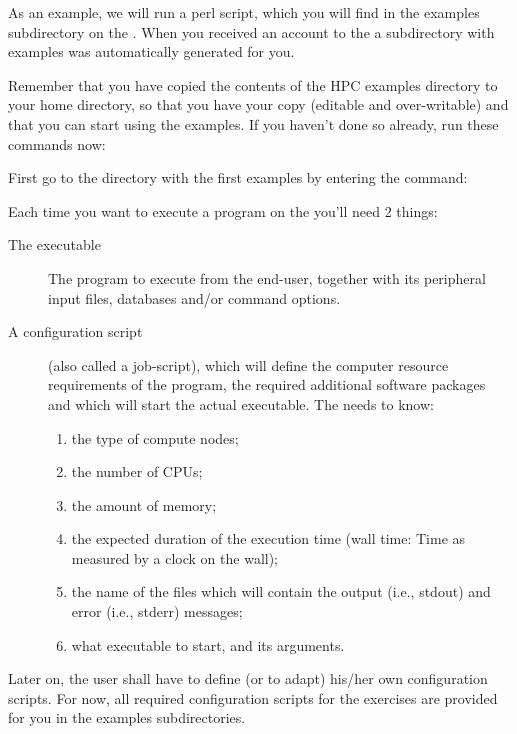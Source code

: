 As an example, we will run a perl script, which you will find in the examples
subdirectory on the \hpc. When you received an account to the \hpc a
subdirectory with examples was automatically generated for you.

Remember that you have copied the contents of the HPC examples directory to
your home directory, so that you have your  copy (editable
and over-writable) and that you can start using the examples. If you haven't
done so already, run these commands now:

\begin{prompt}
\end{prompt}

First go to the directory with the first examples by entering the command:

\begin{prompt}
\end{prompt}

Each time you want to execute a program on the \hpc you'll need 2 things:

\begin{description}
  \item[The executable] The program to execute from the end-user, together with its peripheral input files, databases and/or command options.
  \item[A configuration script] (also called a job-script), which will define the computer resource requirements of the program, the required additional software packages and which will start the actual executable.  The \hpc needs to know:
    \begin{enumerate}
      \item  the type of compute nodes;
      \item  the number of CPUs;
      \item  the amount of memory;
      \item  the expected duration of the execution time (wall time: Time as measured by a clock on the wall);
      \item  the name of the files which will contain the output (i.e., stdout) and error (i.e., stderr) messages;
      \item  what executable to start, and its arguments.
    \end{enumerate}
\end{description}

Later on, the \hpc user shall have to define (or to adapt) his/her own
configuration scripts. For now, all required configuration scripts for the
exercises are provided for you in the examples subdirectories.


